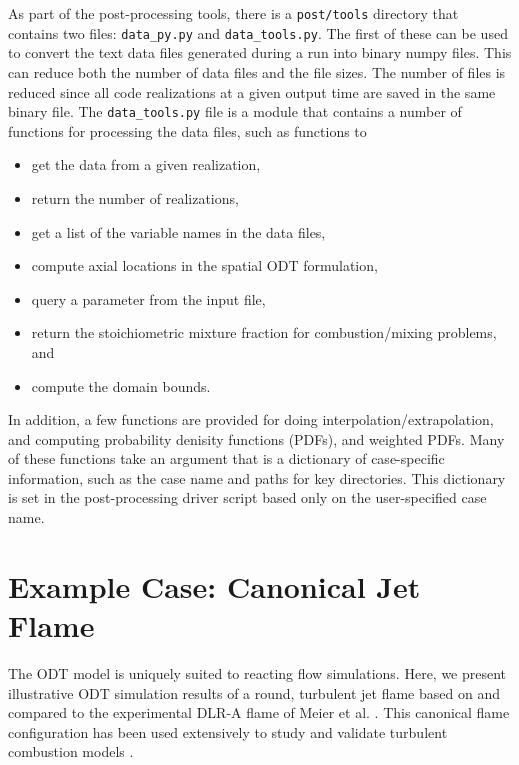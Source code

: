 \documentclass[preprint,12pt, a4paper]{elsarticle}
\begin{document}
As part of the post-processing tools, there is a \texttt{post/tools} directory that contains two files: \texttt{data\_py.py} and \texttt{data\_tools.py}. The first of these can be used to convert the text data files generated during a run into binary numpy files. This can reduce both the number of data files and the file sizes. The number of files is reduced since all code realizations at a given output time are saved in the same binary file. The \texttt{data\_tools.py} file is a module that contains a number of functions for processing the data files, such as functions to
%
\begin{itemize}
    \item get the data from a given realization,
    \item return the number of realizations,
    \item get a list of the variable names in the data files,
    \item compute axial locations in the spatial ODT formulation,
    \item query a parameter from the input file,
    \item return the stoichiometric mixture fraction for combustion/mixing problems, and
    \item compute the domain bounds.
\end{itemize}
%
In addition, a few functions are provided for doing interpolation/extrapolation, and computing probability denisity functions (PDFs), and weighted PDFs.
Many of these functions take an argument that is a dictionary of case-specific information, such as the case name and paths for key directories. This dictionary is set in the post-processing driver script based only on the user-specified case name.


\section{Example Case: Canonical Jet Flame}
\label{sec:examples}

The ODT model is uniquely suited to reacting flow simulations. Here, we present illustrative ODT simulation results of a round, turbulent jet flame based on and compared to the experimental DLR-A flame of Meier et al. \cite{Meier_2000}. This canonical flame configuration has been used extensively to study and validate turbulent combustion models \cite{Pitsch_2000,Lindstedt_2005,Wang_2011,Fairweather_2004,Lee_2008,Lee_2009}. 
\end{document}
